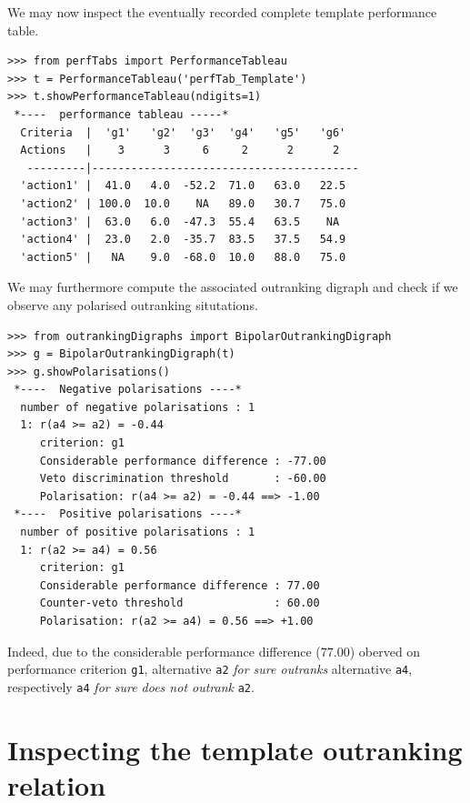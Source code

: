 We may now inspect the eventually recorded complete template performance table.
\begin{lstlisting}
>>> from perfTabs import PerformanceTableau   
>>> t = PerformanceTableau('perfTab_Template')
>>> t.showPerformanceTableau(ndigits=1)
 *----  performance tableau -----*
  Criteria  |  'g1'   'g2'  'g3'  'g4'   'g5'   'g6'   
  Actions   |    3      3     6     2      2      2    
   ---------|-----------------------------------------
  'action1' |  41.0   4.0  -52.2  71.0   63.0   22.5  
  'action2' | 100.0  10.0    NA   89.0   30.7   75.0  
  'action3' |  63.0   6.0  -47.3  55.4   63.5    NA   
  'action4' |  23.0   2.0  -35.7  83.5   37.5   54.9  
  'action5' |   NA    9.0  -68.0  10.0   88.0   75.0
\end{lstlisting}

We may furthermore compute the associated outranking digraph and check if we observe any polarised outranking situtations.
\begin{lstlisting}
>>> from outrankingDigraphs import BipolarOutrankingDigraph
>>> g = BipolarOutrankingDigraph(t)
>>> g.showPolarisations()
 *----  Negative polarisations ----*
  number of negative polarisations : 1 
  1: r(a4 >= a2) = -0.44
     criterion: g1
     Considerable performance difference : -77.00
     Veto discrimination threshold       : -60.00
     Polarisation: r(a4 >= a2) = -0.44 ==> -1.00
 *----  Positive polarisations ----*
  number of positive polarisations : 1 
  1: r(a2 >= a4) = 0.56
     criterion: g1
     Considerable performance difference : 77.00
     Counter-veto threshold              : 60.00
     Polarisation: r(a2 >= a4) = 0.56 ==> +1.00
\end{lstlisting}
Indeed, due to the considerable performance difference ($77.00$) oberved on performance criterion \texttt{g1}, alternative \texttt{a2} \emph{for sure outranks} alternative \texttt{a4}, respectively \texttt{a4} \emph{for sure does not outrank} \texttt{a2}.

\section{Inspecting the template outranking relation}
\label{sec:5.6}

